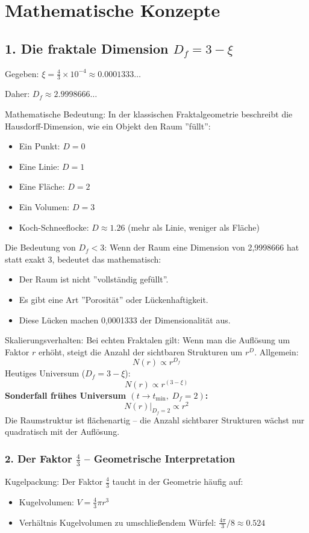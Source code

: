 	\section{Mathematische Konzepte}
	
	\subsection{1. Die fraktale Dimension \( D_f = 3 - \xi \)}
	Gegeben: \( \xi = \frac{4}{3} \times 10^{-4} \approx 0.0001333\ldots \)
	
	Daher: \( D_f \approx 2.9998666\ldots \)
	
	Mathematische Bedeutung:
	In der klassischen Fraktalgeometrie beschreibt die Hausdorff-Dimension, wie ein Objekt den Raum ''füllt'':
	\begin{itemize}
		\item Ein Punkt: \( D = 0 \)
		\item Eine Linie: \( D = 1 \)
		\item Eine Fläche: \( D = 2 \)
		\item Ein Volumen: \( D = 3 \)
		\item Koch-Schneeflocke: \( D \approx 1.26 \) (mehr als Linie, weniger als Fläche)
	\end{itemize}
	
	Die Bedeutung von \( D_f < 3 \):
	Wenn der Raum eine Dimension von 2,9998666 hat statt exakt 3, bedeutet das mathematisch:
	\begin{itemize}
		\item Der Raum ist nicht ''vollständig gefüllt''.
		\item Es gibt eine Art ''Porosität'' oder Lückenhaftigkeit.
		\item Diese Lücken machen 0,0001333 der Dimensionalität aus.
	\end{itemize}
	
	Skalierungsverhalten:
	Bei echten Fraktalen gilt: Wenn man die Auflösung um Faktor \( r \) erhöht, steigt die Anzahl der sichtbaren Strukturen um \( r^D \). Allgemein:
	\[
	N(r) \propto r^{D_f}
	\]
	Heutiges Universum (\( D_f = 3 - \xi \)):
	\[
	N(r) \propto r^{(3-\xi)}
	\]
	\textbf{Sonderfall frühes Universum \((t \to t_{\min},\; D_f = 2)\):}
	\[
	N(r)\big|_{D_f=2} \propto r^{2}
	\]
	Die Raumstruktur ist flächenartig – die Anzahl sichtbarer Strukturen wächst nur quadratisch mit der Auflösung.
	
	\subsubsection{2. Der Faktor \( \frac{4}{3} \) – Geometrische Interpretation}
	Kugelpackung:
	Der Faktor \( \frac{4}{3} \) taucht in der Geometrie häufig auf:
	\begin{itemize}
		\item Kugelvolumen: \( V = \frac{4}{3}\pi r^3 \)
		\item Verhältnis Kugelvolumen zu umschließendem Würfel: \( \frac{4\pi}{3}/8 \approx 0.524 \)
	\end{itemize}
	
